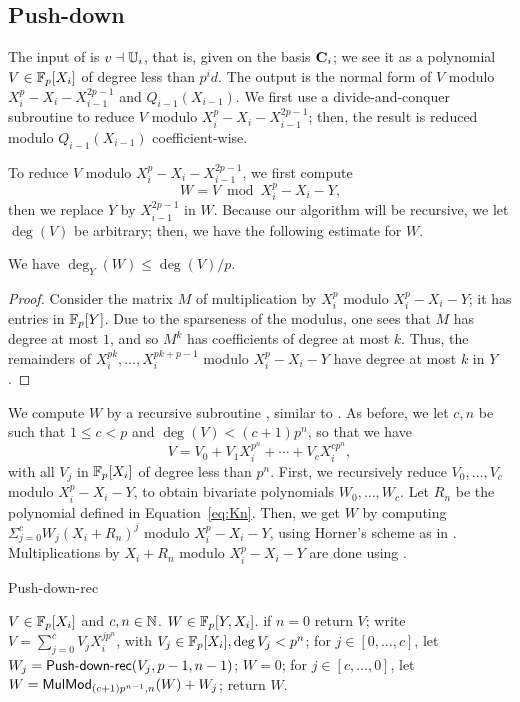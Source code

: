 \subsection{Push-down}\label{sec:level-embedding:push-down}

The input of  is $v \dashv \mathbb{U}_i$, that is, given on the
basis $\mathbf{C}_i$; we see it as a polynomial $V \in \mathbb{F}_p[X_i]$ of degree
less than $p^id$. The output is the normal form of $V$ modulo
$X_i^p-X_i-X_{i-1}^{2p-1}$ and $Q_{i-1}(X_{i-1})$. We first use a
divide-and-conquer subroutine to reduce $V$ modulo
$X_i^p-X_i-X_{i-1}^{2p-1}$; then, the result is reduced modulo
$Q_{i-1}(X_{i-1})$ coefficient-wise.

To reduce $V$ modulo $X_i^p-X_i-X_{i-1}^{2p-1}$, we first compute 
\begin{equation}
  \label{eq:91}
  W=V \bmod X_i^p-X_i-Y
  \text{,} 
\end{equation}
then we replace $Y$ by $X_{i-1}^{2p-1}$ in $W$.  Because our algorithm
will be recursive, we let $\deg(V)$ be arbitrary; then, we have the
following estimate for $W$.

\begin{lemma}
  \label{th:push-down-degree} We have $\deg_Y(W)\le \deg(V)/p$.
\end{lemma}
\begin{proof}
  Consider the matrix $M$ of multiplication by $X_i^p$ modulo
  $X_i^p-X_i-Y$; it has entries in $\mathbb{F}_p[Y]$. Due to the sparseness of
  the modulus, one sees that $M$ has degree at most $1$, and so $M^k$
  has coefficients of degree at most $k$. Thus, the remainders of
  $X_i^{pk},\dots,X_i^{pk+p-1}$ modulo $X_i^p-X_i-Y$ have degree at
  most $k$ in $Y$.
\end{proof}


We compute $W$ by a recursive subroutine , similar
to . As before, we let $c,n$ be such that $1\le c<p$ and
$\deg(V) < (c+1)p^n$, so that we have
$$V=V_0+ V_1X_i^{p^n}+\cdots+V_c X_i^{cp^n},$$ with all $V_j$ in
$\mathbb{F}_p[X_i]$ of degree less than $p^n$. First, we recursively reduce
$V_0,\dots,V_c$ modulo $X_i^p-X_i-Y$, to obtain bivariate
polynomials $W_0,\dots,W_{c}$. Let $R_n$ be the polynomial defined in
Equation~\eqref{eq:Kn}. Then, we get $W$ by computing
$\Sigma_{j=0}^c W_j(X_i+R_n)^j$ modulo $X_i^p-X_i-Y$,
using Horner's scheme as in . Multiplications by
$X_i+R_n$ modulo $X_i^p-X_i-Y$ are done using .

\begin{algorithm}
  \caption{Push-down-rec}
  \begin{algorithmic}[1]
    \REQUIRE $V\in \mathbb{F}_p[X_i]$ and $c,n\in\mathbb{N}$.
    \ENSURE $W \in\mathbb{F}_p[Y,X_i]$.
    \STATE if $n=0$ return $V$;
    \STATE write $V=\sum_{j=0}^{c} V_j X_i^{jp^n}$, with $V_j \in \mathbb{F}_p[X_i], \deg V_j<p^n$;
    \STATE for $j\in [0,\dots,c]$, let $W_j=\text{{\sf Push-down-rec}}(V_j,p-1,n-1)$;
    \STATE $W=0$;
    \STATE\label{pd:loop} for $j\in [c,\dots,0]$, let $W = {\sf MulMod}_{(c+1)p^{n-1},n}(W) + W_j$;
    \STATE return $W$.
  \end{algorithmic}
\end{algorithm}

